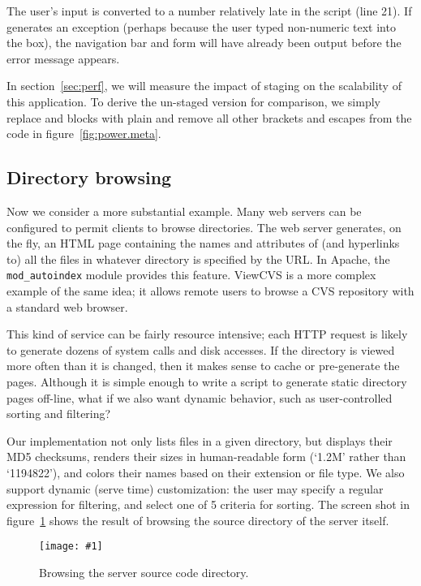 \documentclass{elsart}
\newcommand{\myfig}[3]{%
  \begin{figure}[tbp]%
    #3%
    \caption{#2}%
    \label{fig:#1}%
  \end{figure}}
\newcommand{\screenshot}[2]{%
  \myfig{#1}{#2}
  {\centering%
    \texttt{[image: \#1]}}}
\begin{document}
The user's input is converted to a number relatively late in the
script (line 21).  If 
generates an exception (perhaps because the user typed non-numeric
text into the box), the navigation bar and form will have already been
output before the error message appears.

In section~\ref{sec:perf}, we will measure the impact of staging on
the scalability of this application.  To derive the un-staged version
for comparison, we simply replace \cd{\Mquote{\Mtilde}} and
\cd{\Mquote{!}} blocks with plain \cd{\Mquote{}} and remove all other
brackets and escapes from the code in figure~\ref{fig:power.meta}.

\subsection{Directory browsing}
\label{sec:eg:browse}

Now we consider a more substantial example.
Many web servers can be configured to permit clients to browse
directories.  The web server generates, on the fly, an HTML page
containing the names and attributes of (and hyperlinks to) all
the files in whatever directory is specified by the URL.  In Apache, the
\texttt{mod\_autoindex} module provides this feature.
ViewCVS is a more
complex example of the same idea; it allows remote users to browse a
CVS repository with a standard web browser.

This kind of service can be fairly resource intensive; each HTTP
request is likely to generate dozens of system calls and disk
accesses.  If the directory is viewed more often than it is changed,
then it makes sense to cache or pre-generate the pages.  Although it
is simple enough to write a script to generate static directory pages
off-line, what if we also want dynamic behavior, such as
user-controlled sorting and filtering?

Our implementation not only lists files in a given directory, but
displays their MD5 checksums, renders their sizes in human-readable
form (`1.2M' rather than `1194822'), and colors their names based on
their extension or file type.  We also support dynamic (serve time)
customization: the user may specify a regular expression for
filtering, and select one of 5 criteria for sorting.  The screen shot
in figure~\ref{fig:server-dir} shows the result of browsing the source
directory of the server itself.

\screenshot{server-dir}{Browsing the server source code directory.}
\end{document}
